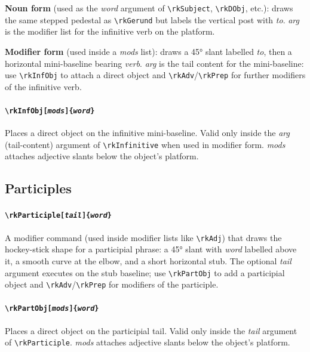 \documentclass[11pt]{article}
\newcommand{\cmd}[1]{\texttt{\textbackslash #1}}
\begin{document}
\textbf{Noun form} (used as the \textit{word} argument of \cmd{rkSubject},
\cmd{rkDObj}, etc.): draws the same stepped pedestal as \cmd{rkGerund} but
labels the vertical post with \emph{to}.  \textit{arg} is the modifier list
for the infinitive verb on the platform.

\textbf{Modifier form} (used inside a \textit{mods} list): draws a 45°
slant labelled \emph{to}, then a horizontal mini-baseline bearing
\textit{verb}.  \textit{arg} is the tail content for the mini-baseline:
use \cmd{rkInfObj} to attach a direct object and \cmd{rkAdv}/\cmd{rkPrep}
for further modifiers of the infinitive verb.

\paragraph{\cmd{rkInfObj[\textit{mods}]\{\textit{word}\}}}
Places a direct object on the infinitive mini-baseline.  Valid only inside
the \textit{arg} (tail-content) argument of \cmd{rkInfinitive} when used
in modifier form.  \textit{mods} attaches adjective slants below the
object's platform.

\subsection*{Participles}

\paragraph{\cmd{rkParticiple[\textit{tail}]\{\textit{word}\}}}
A modifier command (used inside modifier lists like \cmd{rkAdj}) that draws
the hockey-stick shape for a participial phrase: a 45° slant with
\textit{word} labelled above it, a smooth curve at the elbow, and a short
horizontal stub.  The optional \textit{tail} argument executes on the stub
baseline; use \cmd{rkPartObj} to add a participial object and
\cmd{rkAdv}/\cmd{rkPrep} for modifiers of the participle.

\paragraph{\cmd{rkPartObj[\textit{mods}]\{\textit{word}\}}}
Places a direct object on the participial tail.  Valid only inside the
\textit{tail} argument of \cmd{rkParticiple}.  \textit{mods} attaches
adjective slants below the object's platform.
\end{document}
